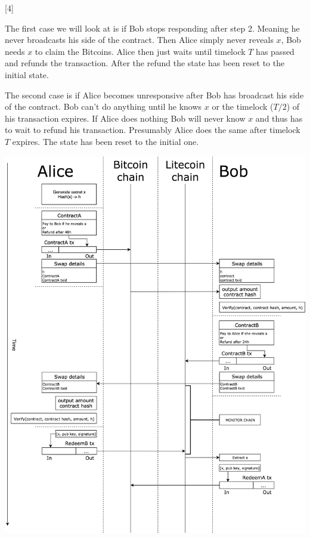 [4]

The first case we will look at is if Bob stops responding after step 2. Meaning he never broadcasts his side of the contract. Then Alice simply never reveals $x$, Bob needs $x$ to claim the Bitcoins. Alice then just waits until timelock $T$ has passed and refunds the transaction. After the refund the state has been reset to the initial state.

The second case is if Alice becomes unresponsive after Bob has broadcast his side of the contract. Bob can't do anything until he knows $x$ or the timelock ($T/2$) of his transaction expires. If Alice does nothing Bob will never know $x$ and thus has to wait to refund his transaction. Presumably Alice does the same after timelock $T$ expires. The state has been reset to the initial one.

\newpage
\centerline{\includegraphics[width=1.35\textwidth]{background/images/atomic_swap_flow_large.png}}
\newpage


